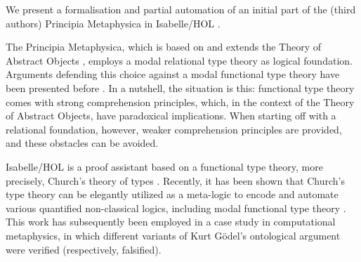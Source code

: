 %
\begin{isabellebody}%
\def\isabellecontext{TheoryOfAbstractObjectsV{\isadigit{1}}}%
%
\isadelimtheory
%
\endisadelimtheory
%
\isatagtheory
%
\endisatagtheory
{\isafoldtheory}%
%
\isadelimtheory
%
\endisadelimtheory
%
\isamarkuptrue%
%
\begin{isamarkuptext}%
We present a formalisation and partial automation of an initial part of the (third authors)
 Principia Metaphysica \cite{zalta:_princ_metap} in Isabelle/HOL \cite{Isabelle}.  

 The Principia Metaphysica, which is based on and extends the Theory of Abstract 
 Objects \cite{zalta83:_abstr_objec}, 
 employs a modal relational type theory as logical foundation. Arguments
 defending this choice against a modal functional type theory 
 have been presented before \cite{zalta11:_relat_versus_funct_found_logic}.
 In a nutshell, the situation is this: functional type theory comes with strong 
 comprehension principles, which, in the context of the Theory of Abstract Objects, 
 have paradoxical implications. When starting off with a relational foundation, however, 
 weaker comprehension principles are provided, and these obstacles can be avoided.

 Isabelle/HOL is a proof assistant based on a functional type theory, 
 more precisely, Church's theory of types \cite{Church40}. Recently, it has been shown 
 that Church's type theory can be elegantly utilized as a meta-logic to encode and 
 automate various quantified non-classical logics, including modal functional type 
 theory \cite{J23,C40}. This work has subsequently been employed in a case study in
 computational metaphysics, in which different variants of Kurt Gödel's ontological 
 argument \cite{ECAI} were verified (respectively, falsified). 
 


\end{isamarkuptext}
\end{isabellebody}
